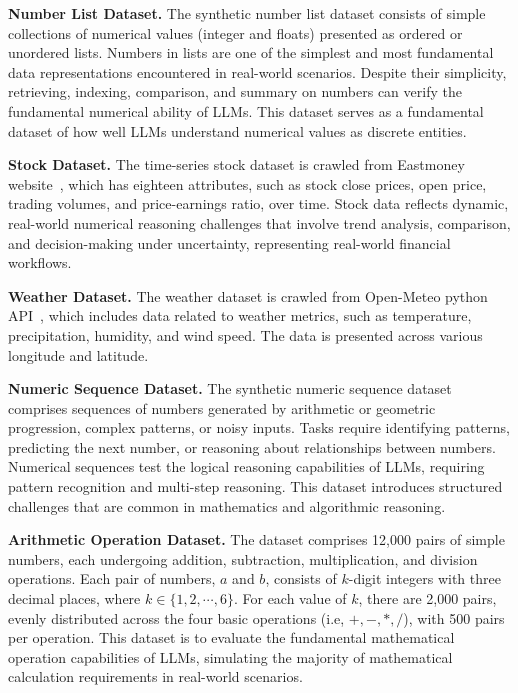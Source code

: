 \noindent\textbf{Number List Dataset.}
The synthetic number list dataset consists of simple collections of numerical values (integer and floats) 
presented as ordered or unordered lists.
Numbers in lists are one of the simplest and most fundamental data representations encountered in real-world scenarios.
Despite their simplicity, retrieving, indexing,  comparison, and summary on numbers can verify the fundamental numerical ability of LLMs. 
This dataset serves as a fundamental dataset of how well LLMs understand numerical values as discrete entities.



\noindent\textbf{Stock Dataset.}
The time-series  stock dataset is crawled from Eastmoney website~\cite{eastmoney}, 
which has eighteen attributes, such as stock close prices, open price,  trading volumes, and price-earnings ratio, over time.
Stock  data reflects dynamic, real-world numerical reasoning challenges that involve trend analysis, comparison, and decision-making under uncertainty,  representing real-world financial workflows.
 




\noindent\textbf{Weather Dataset.}
The weather dataset is crawled from Open-Meteo python API~\citep{openmeteo}, which includes data related to weather metrics, such as temperature, precipitation, humidity, and wind speed. 
The data is presented across various longitude and latitude.
 
 




\noindent\textbf{Numeric Sequence  Dataset.}
The synthetic numeric sequence dataset comprises sequences of numbers generated by arithmetic or geometric progression, complex patterns, or noisy inputs. 
Tasks require identifying patterns, predicting the next number, or reasoning about relationships between numbers.
Numerical sequences test the logical reasoning capabilities of LLMs, requiring pattern recognition and multi-step reasoning. This dataset introduces structured challenges that are common in mathematics and algorithmic reasoning.


 
\noindent\textbf{Arithmetic Operation Dataset.}
The dataset comprises 12,000 pairs of simple numbers, each undergoing addition, subtraction, multiplication, and division operations. Each pair of numbers, $a$ and $b$, consists of $k$-digit integers with three decimal places, where $k \in \{1, 2, \cdots, 6\}$. 
For each value of $k$, there are 2,000 pairs, evenly distributed across the four basic operations (i.e, $+, -,  *, /$), with 500 pairs per operation. 
This dataset is to evaluate the fundamental mathematical operation capabilities of LLMs, simulating the majority of mathematical calculation requirements in real-world scenarios.

